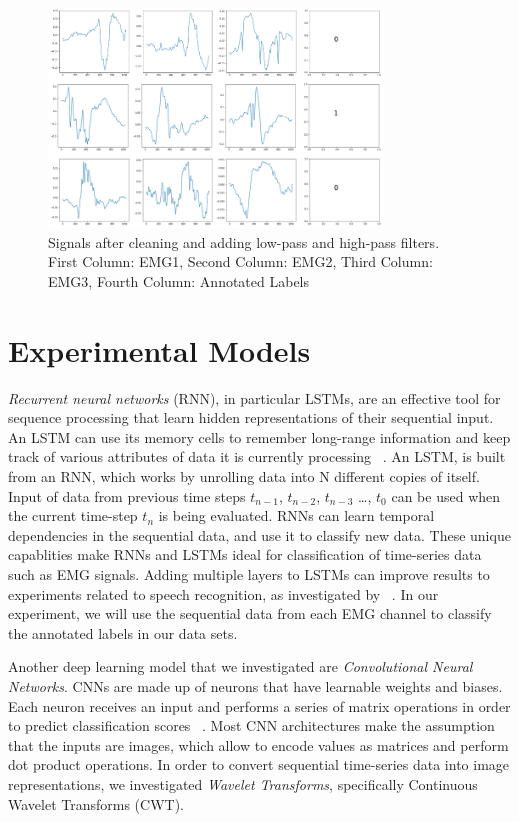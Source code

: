 \documentclass[conference]{IEEEtran}
\begin{document}
\begin{figure}[!t]
\centering
\includegraphics[width=3.5in]{images/cleaned_signals.png}
\caption{Signals after cleaning and adding low-pass and high-pass filters. First Column: EMG1, Second Column: EMG2, Third Column: EMG3, Fourth Column: Annotated Labels}
\label{fig: cleaned_signals}
\end{figure}

\section{Experimental Models}
\textit{Recurrent neural networks} (RNN), in particular LSTMs, are an effective tool for sequence processing that learn hidden representations of their sequential input. An LSTM can use its memory cells to remember long-range information and keep track of various attributes of data it is currently processing ~\cite{karpathy_visualizing_2016}. An LSTM, is built from an RNN, which works by unrolling data into N different copies of itself. Input of data from previous time steps $t_{n-1}$, $t_{n-2}$, $t_{n-3}$ \ldots, $t_{0}$ can be used when the current time-step $t_{n}$ is being evaluated. RNNs can learn temporal dependencies in the sequential data, and use it to classify new data. These unique capablities make RNNs and LSTMs ideal for classification of time-series data such as EMG signals. Adding multiple layers to LSTMs can improve results to experiments related to speech recognition, as investigated by ~\cite{graves_speech_2013}. In our experiment, we will use the sequential data from each EMG channel to classify the annotated labels in our data sets.

Another deep learning model that we investigated are \textit{Convolutional Neural Networks}. CNNs are made up of neurons that have learnable weights and biases. Each neuron receives an input and performs a series of matrix operations in order to predict classification scores ~\cite{noauthor_cs231n_nodate}. Most CNN architectures make the assumption that the inputs are images, which allow to encode values as matrices and perform dot product operations.  In order to convert sequential time-series data into image representations, we investigated \textit{Wavelet Transforms}, specifically Continuous Wavelet Transforms (CWT).
\end{document}
